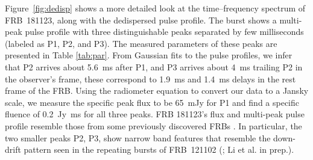 
Figure~\ref{fig:dedisp} shows a more detailed look at the time--frequency spectrum of FRB~181123, along with the dedispersed pulse profile. The burst shows a multi-peak pulse profile with three distinguishable peaks separated by few milliseconds (labeled as P1, P2, and P3). The measured parameters of these peaks are presented in Table \ref{tab:par}. 
From Gaussian fits to the pulse profiles, we infer that P2 arrives about 5.6~ms after P1, and P3 arrives about 4~ms trailing P2 in the observer's frame, these correspond to 1.9~ms and 1.4~ms delays in the rest frame of the FRB.
Using the radiometer equation to convert our data to a Jansky scale, we measure the specific peak flux to be 65~mJy for P1 and find a specific fluence of 0.2~Jy~ms for all three peaks.
FRB 181123's flux and multi-peak pulse profile resemble those from some previously discovered FRBs \citep{cpk+16}.
In particular, the two smaller peaks P2, P3, show narrow band features that resemble the down-drift pattern seen in the repeating bursts of FRB~121102 (\citealt{gsp+18, hessels19}; Li et al. in prep.). 

